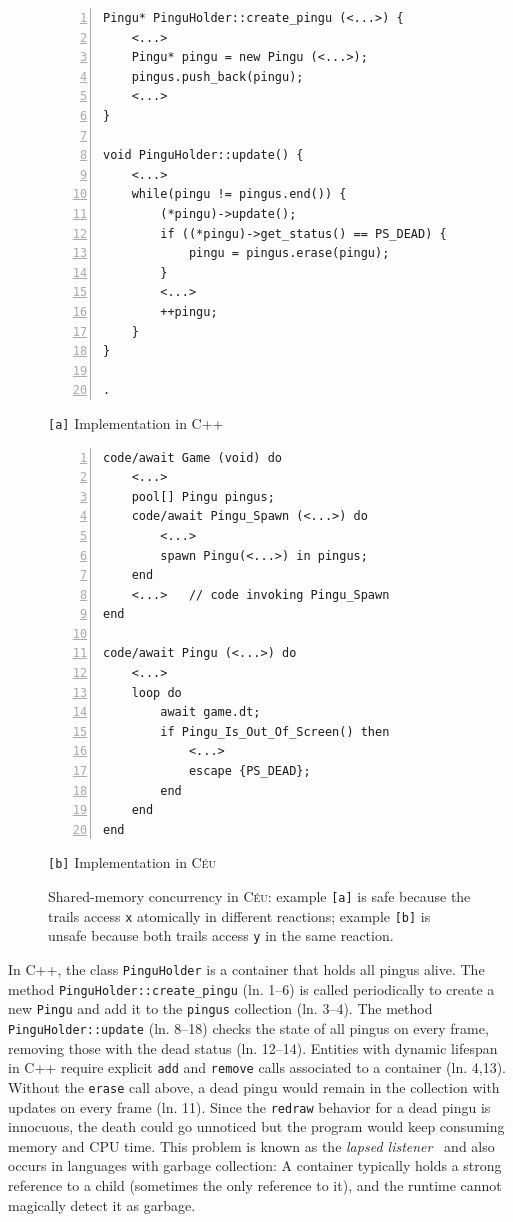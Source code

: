 \documentclass{vgtc}                          %
\newcommand{\CEU}{\textsc{C\'{e}u}\xspace}
\newcommand{\code}[1] {{\small{\texttt{#1}}}}
\newcommand{\ax}{\code{[a]}\xspace}
\newcommand{\bx}{\code{[b]}\xspace}
\begin{document}
\begin{figure}[t]
\begin{minipage}[t]{0.50\linewidth}
\begin{lstlisting}[numbers=left,xleftmargin=3em]
Pingu* PinguHolder::create_pingu (<...>) {
    <...>
    Pingu* pingu = new Pingu (<...>);
    pingus.push_back(pingu);
    <...>
}

void PinguHolder::update() {
    <...>
    while(pingu != pingus.end()) {
        (*pingu)->update();
        if ((*pingu)->get_status() == PS_DEAD) {
            pingu = pingus.erase(pingu);
        }
        <...>
        ++pingu;
    }
}

.
\end{lstlisting}
\centering\small{\ax Implementation in C++}
\end{minipage}
%
\begin{minipage}[t]{0.50\linewidth}
\begin{lstlisting}[numbers=left,xleftmargin=3em]
code/await Game (void) do
    <...>
    pool[] Pingu pingus;
    code/await Pingu_Spawn (<...>) do
        <...>
        spawn Pingu(<...>) in pingus;
    end
    <...>   // code invoking Pingu_Spawn
end

code/await Pingu (<...>) do
    <...>
    loop do
        await game.dt;
        if Pingu_Is_Out_Of_Screen() then
            <...>
            escape {PS_DEAD};
        end
    end
end
\end{lstlisting}
\centering\small{\bx Implementation in \CEU}
\end{minipage}
\caption{ Shared-memory concurrency in \CEU:
example \ax is safe because the trails access \code{x} atomically in different 
reactions;
example \bx is unsafe because both trails access \code{y} in the same reaction.
\label{lst.shared}
}
\end{figure}

In C++, the class \code{PinguHolder} is a container that holds all pingus
alive.
%
The method \code{PinguHolder::create\_pingu} (ln. 1--6) is called periodically
to create a new \code{Pingu} and add it to the \code{pingus} collection
(ln. 3--4).
The method \code{PinguHolder::update} (ln. 8--18) checks the state of all
pingus on every frame, removing those with the dead status (ln. 12--14).
%
Entities with dynamic lifespan in C++ require explicit \code{add} and
\code{remove} calls associated to a container (ln. 4,13).
Without the \code{erase} call above, a dead pingu would remain in the
collection with updates on every frame (ln. 11).
Since the \code{redraw} behavior for a dead pingu is innocuous, the death could
go unnoticed but the program would keep consuming memory and CPU time.
This problem is known as the \emph{lapsed listener}~\cite{games.patters} and
also occurs in languages with garbage collection:
A container typically holds a strong reference to a child (sometimes the only 
reference to it), and the runtime cannot magically detect it as garbage.
\end{document}
